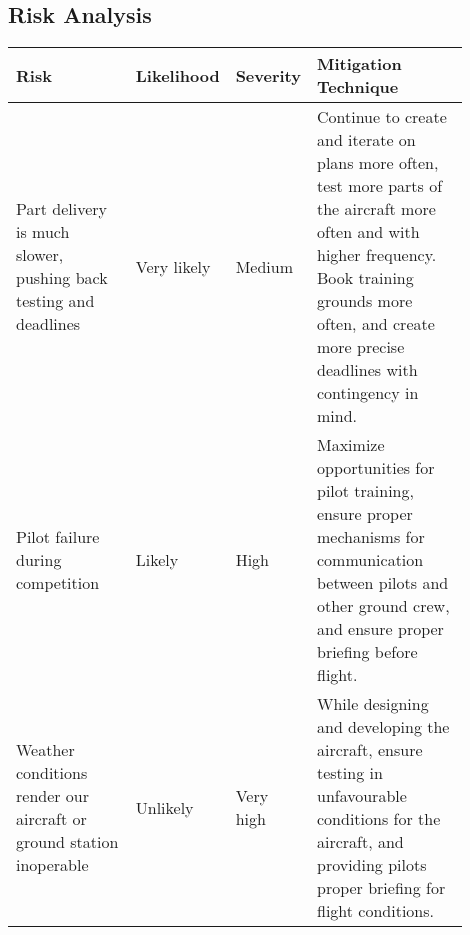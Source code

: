 \subsection{Risk Analysis}
\label{sec:risk-analysis}

\begin{table}[htpb]
	\centering
	\begin{tabular}{p{0.28\linewidth}  p{0.14\linewidth}  p{0.12\linewidth}
		 p{0.36\linewidth} }

		\textbf{Risk} &
		\textbf{Likelihood} & \textbf{Severity} &
		\textbf{Mitigation Technique} \\ \midrule

	    Part delivery is much
		slower, pushing back
		testing and deadlines &
		Very likely & Medium & %
		Continue to create and iterate on plans more often, test more parts of
		the aircraft more often and with higher frequency. Book training
		grounds more often, and create more precise deadlines with contingency
		in mind. \\ \midrule

	    Pilot failure during competition &
		Likely & High & %
		Maximize opportunities for pilot training, ensure proper mechanisms for
		communication between pilots and other ground crew, and ensure proper
		briefing before flight. \\ \midrule

	    Weather conditions render our aircraft or ground station inoperable &
		Unlikely & Very high & %
		While designing and developing the aircraft, ensure testing in
		unfavourable conditions for the aircraft, and providing pilots proper
		briefing for flight conditions. \\ \midrule

	\end{tabular}
\end{table}

